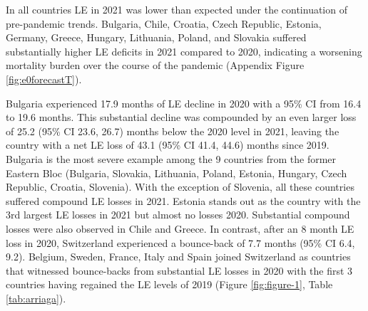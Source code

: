 \documentclass[12pt]{article}
\begin{document}
In all countries LE in 2021 was lower than expected under the continuation of pre-pandemic trends. Bulgaria, Chile, Croatia, Czech Republic, Estonia, Germany, Greece, Hungary, Lithuania, Poland, and Slovakia suffered substantially higher LE deficits in 2021 compared to 2020, indicating a worsening mortality burden over the course of the pandemic (Appendix Figure \ref{fig:e0forecastT}).

Bulgaria experienced 17.9 months of LE decline in 2020 with a 95\% CI from 16.4 to 19.6 months. This substantial decline was compounded by an even larger loss of 25.2 (95\% CI 23.6, 26.7) months below the 2020 level in 2021, leaving the country with a net LE loss of 43.1 (95\% CI 41.4, 44.6) months since 2019. Bulgaria is the most severe example among the 9 countries from the former Eastern Bloc (Bulgaria, Slovakia, Lithuania, Poland, Estonia, Hungary, Czech Republic, Croatia, Slovenia). With the exception of Slovenia, all these countries suffered compound LE losses in 2021. Estonia stands out as the country with the 3rd largest LE losses in 2021 but almost no losses 2020. Substantial compound losses were also observed in Chile and Greece. In contrast, after an 8 month LE loss in 2020, Switzerland experienced a bounce-back of 7.7 months (95\% CI 6.4, 9.2). Belgium, Sweden, France, Italy and Spain joined Switzerland as countries that witnessed bounce-backs from substantial LE losses in 2020 with the first 3 countries having regained the LE levels of 2019 (Figure \ref{fig:figure-1}, Table \ref{tab:arriaga}).
\end{document}
